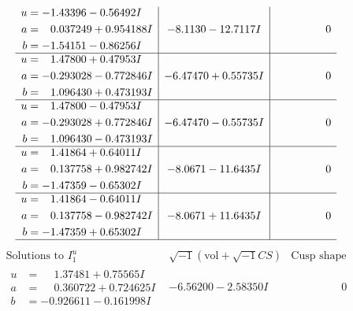 \documentclass[1p]{elsarticle_modified}
\theoremstyle{definition}
\newcommand{\I}{\sqrt{-1}}
\begin{document}
$$\begin{array}{c|c|c}
\begin{aligned}
u &= -1.43396 - 0.56492 I \\
a &= \phantom{-}0.037249 + 0.954188 I \\
b &= -1.54151 - 0.86256 I\end{aligned}
 & -8.1130 - 12.7117 I & \phantom{-0.000000 } 0 \\ \hline\begin{aligned}
u &= \phantom{-}1.47800 + 0.47953 I \\
a &= -0.293028 - 0.772846 I \\
b &= \phantom{-}1.096430 + 0.473193 I\end{aligned}
 & -6.47470 + 0.55735 I & \phantom{-0.000000 } 0 \\ \hline\begin{aligned}
u &= \phantom{-}1.47800 - 0.47953 I \\
a &= -0.293028 + 0.772846 I \\
b &= \phantom{-}1.096430 - 0.473193 I\end{aligned}
 & -6.47470 - 0.55735 I & \phantom{-0.000000 } 0 \\ \hline\begin{aligned}
u &= \phantom{-}1.41864 + 0.64011 I \\
a &= \phantom{-}0.137758 + 0.982742 I \\
b &= -1.47359 - 0.65302 I\end{aligned}
 & -8.0671 - 11.6435 I & \phantom{-0.000000 } 0 \\ \hline\begin{aligned}
u &= \phantom{-}1.41864 - 0.64011 I \\
a &= \phantom{-}0.137758 - 0.982742 I \\
b &= -1.47359 + 0.65302 I\end{aligned}
 & -8.0671 + 11.6435 I & \phantom{-0.000000 } 0\\
 \hline 
 \end{array}$$\newpage$$\begin{array}{c|c|c}  
\text{Solutions to }I^u_{1}& \I (\text{vol} + \sqrt{-1}CS) & \text{Cusp shape}\\
 \hline 
\begin{aligned}
u &= \phantom{-}1.37481 + 0.75565 I \\
a &= \phantom{-}0.360722 + 0.724625 I \\
b &= -0.926611 - 0.161998 I\end{aligned}
 & -6.56200 - 2.58350 I & \phantom{-0.000000 } 0 \\ \hline\begin{aligned}

\end{aligned}
\end{array}$$
\end{document}
